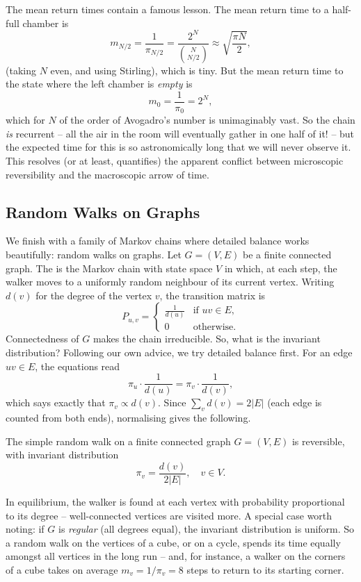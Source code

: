 \documentclass[a4paper]{scrartcl}
\begin{document}
\begin{example}
	The mean return times contain a famous lesson. The mean return time to a half-full chamber is
	$$
	m_{N/2} = \frac{1}{\pi_{N/2}} = \frac{2^N}{\binom{N}{N/2}} \approx \sqrt{\frac{\pi N}{2}},
	$$
	(taking $N$ even, and using Stirling), which is tiny. But the mean return time to the state where the left chamber is \emph{empty} is
	$$
	m_0 = \frac{1}{\pi_0} = 2^N,
	$$
	which for $N$ of the order of Avogadro's number is unimaginably vast. So the chain \emph{is} recurrent -- all the air in the room will eventually gather in one half of it! -- but the expected time for this is so astronomically long that we will never observe it. This resolves (or at least, quantifies) the apparent conflict between microscopic reversibility and the macroscopic arrow of time.
\end{example}

\subsection{Random Walks on Graphs}

We finish with a family of Markov chains where detailed balance works beautifully: random walks on graphs. Let $G = (V, E)$ be a finite connected graph. The  is the Markov chain with state space $V$ in which, at each step, the walker moves to a uniformly random neighbour of its current vertex. Writing $d(v)$ for the degree of the vertex $v$, the transition matrix is
$$
P_{u, v} = \begin{cases}
	\frac{1}{d(u)} &\mbox{if } uv \in E, \\
	0 &\mbox{otherwise}.
   \end{cases}
$$
Connectedness of $G$ makes the chain irreducible. So, what is the invariant distribution? Following our own advice, we try detailed balance first. For an edge $uv \in E$, the equations read
$$
\pi_u \cdot \frac{1}{d(u)} = \pi_v \cdot \frac{1}{d(v)},
$$
which says exactly that $\pi_v \propto d(v)$. Since $\sum_{v} d(v) = 2|E|$ (each edge is counted from both ends), normalising gives the following.

\begin{proposition}
	The simple random walk on a finite connected graph $G = (V, E)$ is reversible, with invariant distribution
	$$
	\pi_v = \frac{d(v)}{2|E|}, \quad v \in V.
	$$
\end{proposition}

In equilibrium, the walker is found at each vertex with probability proportional to its degree -- well-connected vertices are visited more. A special case worth noting: if $G$ is \emph{regular} (all degrees equal), the invariant distribution is uniform. So a random walk on the vertices of a cube, or on a cycle, spends its time equally amongst all vertices in the long run -- and, for instance, a walker on the corners of a cube takes on average $m_v = 1/\pi_v = 8$ steps to return to its starting corner.
\end{document}
